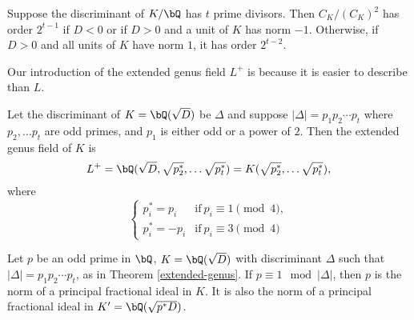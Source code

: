 \begin{thm}\cite[Ch VI, \S3, Theorem 3.9]{Janusz}\label{2-part}
Suppose the discriminant of $K / \bQ$ has $t$ prime divisors. Then $C_K / (C_K)^2$ has order $2^{t-1}$ if $D < 0$ or if $D > 0$ and a unit of $K$ has norm $-1$. Otherwise, if $D > 0$ and all units of $K$ have norm $1$, it has order $2^{t - 2}$.
\end{thm} 
Our introduction of the extended genus field $L^{+}$ is because it is easier to describe than $L$.

\begin{thm}\label{extended-genus}\cite[Ch VI, \S3, Theorem 3.10]{Janusz}
Let the discriminant of $K = \bQ(\sqrt{D})$ be $\Delta$ and suppose $|\Delta| = p_1 p_2 \cdots p_t$ where $p_2, \ldots p_t$ are odd primes, and $p_1$ is either odd or a power of $2$. Then the extended genus field of $K$ is 
    \[ L^{+} = \bQ(\sqrt{D}, \sqrt{p_2^*}, \ldots \sqrt{p_t^*}) = K(\sqrt{p_2^*}, \ldots \sqrt{p_t^*}), \] 
where 
\[ \begin{cases}
    p_i^* = p_i & \mathrm{if }\ p_i \equiv 1 \pmod 4, \\
    p_i^* = -p_i & \mathrm{if }\ p_i \equiv 3 \pmod 4
\end{cases}\]
\end{thm} 

\vspace{1em}

\begin{cor}\label{p-one-mod-disc}
    Let $p$ be an odd prime in $\bQ$, $K = \bQ(\sqrt{D})$ with discriminant $\Delta$ such that $|\Delta| = p_1 p_2 \cdots p_t$, as in Theorem \ref{extended-genus}. If $p \equiv 1 \mod {|\Delta|}$, then $p$ is the norm of a principal fractional ideal in $K$. 
    It is also the norm of a principal fractional ideal in $K' = \bQ({\sqrt{p^*D}})$.
\end{cor}

